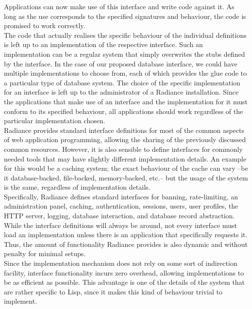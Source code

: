 \documentclass{sig-alternate}
\begin{document}
Applications can now make use of this interface and write code against it. As long as the use corresponds to the specified signatures and behaviour, the code is promised to work correctly. \\

The code that actually realises the specific behaviour of the individual definitions is left up to an implementation of the respective interface. Such an implementation can be a regular system that simply overwrites the stubs defined by the interface. In the case of our proposed database interface, we could have multiple implementations to choose from, each of which provides the glue code to a particular type of database system. The choice of the specific implementation for an interface is left up to the administrator of a Radiance installation. Since the applications that make use of an interface and the implementation for it must conform to its specified behaviour, all applications should work regardless of the particular implementation chosen. \\

Radiance provides standard interface definitions for most of the common aspects of web application programming, allowing the sharing of the previously discussed common resources. However, it is also sensible to define interfaces for commonly needed tools that may have slightly different implementation details. An example for this would be a caching system; the exact behaviour of the cache can vary --be it database-backed, file-backed, memory-backed, etc.-- but the usage of the system is the same, regardless of implementation details. \\

Specifically, Radiance defines standard interfaces for banning, rate-limiting, an administration panel, caching, authentication, sessions, users, user profiles, the HTTP server, logging, database interaction, and database record abstraction. While the interface definitions will always be around, not every interface must load an implementation unless there is an application that specifically requests it. Thus, the amount of functionality Radiance provides is also dynamic and without penalty for minimal setups. \\

Since the implementation mechanism does not rely on some sort of indirection facility, interface functionality incurs zero overhead, allowing implementations to be as efficient as possible. This advantage is one of the details of the system that are rather specific to Lisp, since it makes this kind of behaviour trivial to implement. \\
\end{document}
